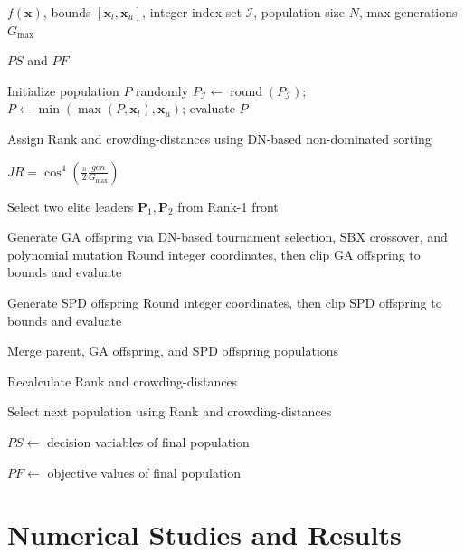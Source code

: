 \begin{algorithm}[!t]
	\caption{SPD-DN-NSGA-II}
	\label{alg:spd_dn_nsgaii}
	\begin{algorithmic}[1]
		
		\Require $f(\mathbf{x})$, bounds $[\mathbf{x}_l,\mathbf{x}_u]$,
		integer index set $\mathcal I$, population size $N$, max generations $G_{\max}$
		
		\Ensure $PS$ and $PF$
		
		\State Initialize population $P$ randomly
		\State $P_{\mathcal I}\gets\operatorname{round}(P_{\mathcal I})$; $P\gets\min(\max(P,\mathbf{x}_l),\mathbf{x}_u)$; evaluate $P$
		
		\State Assign Rank and crowding-distances using DN-based non-dominated sorting
		
		
		\State $JR=\cos^4\!\left(\frac{\pi}{2}\frac{gen}{G_{\max}}\right)$
		
		\State Select two elite leaders $\mathbf{P}_1,\mathbf{P}_2$
		from Rank-1 front
		
		\State Generate GA offspring via DN-based tournament
		selection, SBX crossover, and polynomial mutation
		\State Round integer coordinates, then clip GA offspring to bounds and evaluate
		
		\State Generate SPD offspring
		\State Round integer coordinates, then clip SPD offspring to bounds and evaluate
		\EndIf
		
		\State Merge parent, GA offspring, and SPD offspring populations
		
		\State Recalculate Rank and crowding-distances
		
		\State Select next population using Rank and crowding-distances
		
		\EndFor
		
		\State $PS \gets$ decision variables of final population
		
		\State $PF \gets$ objective values of final population
		
	\end{algorithmic}
\end{algorithm}

\section{Numerical Studies and Results}
